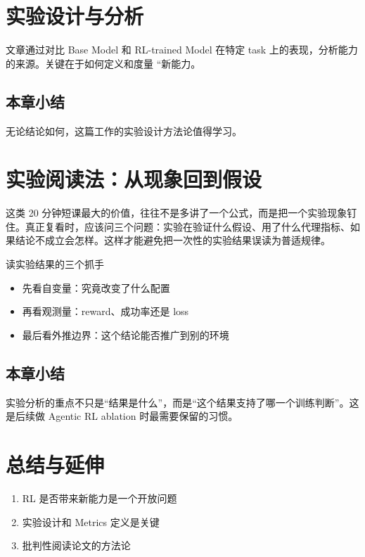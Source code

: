 \documentclass[a4paper]{article}
\begin{document}
\section{实验设计与分析}
文章通过对比 Base Model 和 RL-trained Model 在特定 task 上的表现，分析能力的来源。关键在于如何定义和度量 ``新能力。

\subsection{本章小结}
无论结论如何，这篇工作的实验设计方法论值得学习。

\newpage
\section{实验阅读法：从现象回到假设}
这类 20 分钟短课最大的价值，往往不是多讲了一个公式，而是把一个实验现象钉住。真正复看时，应该问三个问题：实验在验证什么假设、用了什么代理指标、如果结论不成立会怎样。这样才能避免把一次性的实验结果误读为普适规律。

\begin{knowledgebox}{读实验结果的三个抓手}
\begin{itemize}
  \item 先看自变量：究竟改变了什么配置
  \item 再看观测量：reward、成功率还是 loss
  \item 最后看外推边界：这个结论能否推广到别的环境
\end{itemize}
\end{knowledgebox}

\subsection{本章小结}
实验分析的重点不只是“结果是什么”，而是“这个结果支持了哪一个训练判断”。这是后续做 Agentic RL ablation 时最需要保留的习惯。

\newpage
\section{总结与延伸}
\begin{enumerate}
  \item RL 是否带来新能力是一个开放问题
  \item 实验设计和 Metrics 定义是关键
  \item 批判性阅读论文的方法论
\end{enumerate}
\end{document}
